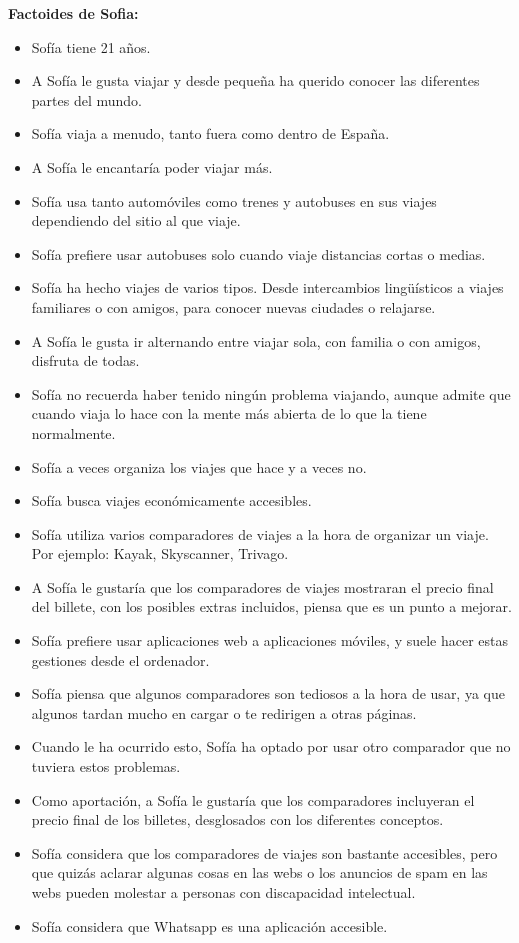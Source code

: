 \textbf{Factoides de Sofia:}

\begin{itemize}
    \item Sofía tiene 21 años.
    \item A Sofía le gusta viajar y desde pequeña ha querido conocer las diferentes partes del mundo.
    \item Sofía viaja a menudo, tanto fuera como dentro de España.
    \item A Sofía le encantaría poder viajar más.
    \item Sofía usa tanto automóviles como trenes y autobuses en sus viajes dependiendo del sitio al que viaje.
    \item Sofía prefiere usar autobuses solo cuando viaje distancias cortas o medias.
    \item Sofía ha hecho viajes de varios tipos. Desde intercambios lingüísticos a viajes familiares o con amigos, para conocer nuevas ciudades o relajarse.
    \item A Sofía le gusta ir alternando entre viajar sola, con familia o con amigos, disfruta de todas.
    \item Sofía no recuerda haber tenido ningún problema viajando, aunque admite que cuando viaja lo hace con la mente más abierta de lo que la tiene normalmente.
    \item Sofía a veces organiza los viajes que hace y a veces no.
    \item Sofía busca viajes económicamente accesibles.
    \item Sofía utiliza varios comparadores de viajes a la hora de organizar un viaje. Por ejemplo: Kayak, Skyscanner, Trivago.
    \item A Sofía le gustaría que los comparadores de viajes mostraran el precio final del billete, con los posibles extras incluidos, piensa que es un punto a mejorar.
    \item Sofía prefiere usar aplicaciones web a aplicaciones móviles, y suele hacer estas gestiones desde el ordenador.
    \item Sofía piensa que algunos comparadores son tediosos a la hora de usar, ya que algunos tardan mucho en cargar o te redirigen a otras páginas.
    \item Cuando le ha ocurrido esto, Sofía ha optado por usar otro comparador que no tuviera estos problemas.
    \item Como aportación, a Sofía le gustaría que los comparadores incluyeran el precio final de los billetes, desglosados con los diferentes conceptos.
    \item Sofía considera que los comparadores de viajes son bastante accesibles, pero que quizás aclarar algunas cosas en las webs o los anuncios de spam en las webs pueden molestar a personas con discapacidad intelectual.
    \item Sofía considera que Whatsapp es una aplicación accesible.
\end{itemize}


